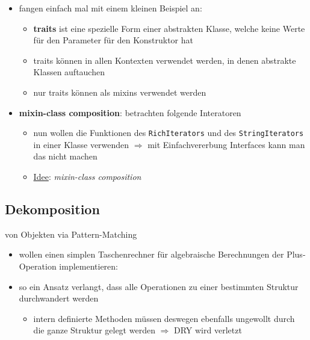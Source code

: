 \begin{itemize}
  \item fangen einfach mal mit einem kleinen Beispiel an:
  
  
  
  \begin{itemize}
    \item \textbf{traits} ist eine spezielle Form einer abstrakten Klasse, welche
    keine Werte für den Parameter für den Konstruktor hat
    \item traits können in allen Kontexten verwendet werden, in denen abstrakte
    Klassen auftauchen
    \item nur traits können als mixins verwendet werden
  \end{itemize}
  
  \item \textbf{mixin-class composition}: betrachten folgende Interatoren
  
  
  
  \begin{itemize}
    \item nun wollen die Funktionen des \texttt{RichIterators} und des
    \texttt{StringIterators} in einer Klasse verwenden $\Rightarrow$ mit
    Einfachvererbung \und Interfaces kann man das nicht machen
    \item \uline{Idee}: \textit{mixin-class composition}
    
    
    
  \end{itemize}
\end{itemize}


\subsection{Dekomposition}
von Objekten via Pattern-Matching


\begin{itemize}
  \item wollen einen simplen Taschenrechner für algebraische Berechnungen \und 
  der Plus-Operation implementieren:
  
  
  
  \item so ein Ansatz verlangt, dass alle Operationen zu einer bestimmten
  Struktur durchwandert werden
  
  \begin{itemize}
    \item intern definierte Methoden müssen deswegen ebenfalls ungewollt
    durch die ganze Struktur gelegt werden $\Rightarrow$ DRY wird
    verletzt
  \end{itemize}
\end{itemize}


